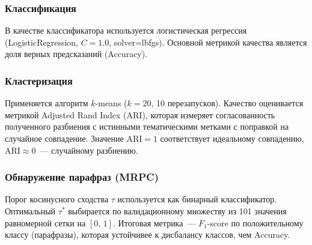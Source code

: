 \subsubsection{Классификация}

В качестве классификатора используется логистическая регрессия
(LogisticRegression, $C{=}1.0$, solver=lbfgs).
Основной метрикой качества является доля верных предсказаний (Accuracy).

\subsubsection{Кластеризация}

Применяется алгоритм $k$-means ($k = 20$, 10 перезапусков).
Качество оценивается метрикой Adjusted Rand Index (ARI), которая измеряет
согласованность полученного разбиения с истинными тематическими метками
с поправкой на случайное совпадение. Значение $\mathrm{ARI} = 1$
соответствует идеальному совпадению, $\mathrm{ARI} \approx 0$~---
случайному разбиению.

\subsubsection{Обнаружение парафраз (MRPC)}

Порог косинусного сходства $\tau$ используется как бинарный классификатор.
Оптимальный $\tau^{*}$ выбирается по валидационному множеству из 101 значения
равномерной сетки на $[0,\,1]$. Итоговая метрика~--- $F_1$-score по
положительному классу (парафразы), которая устойчивее к дисбалансу классов,
чем Accuracy.
